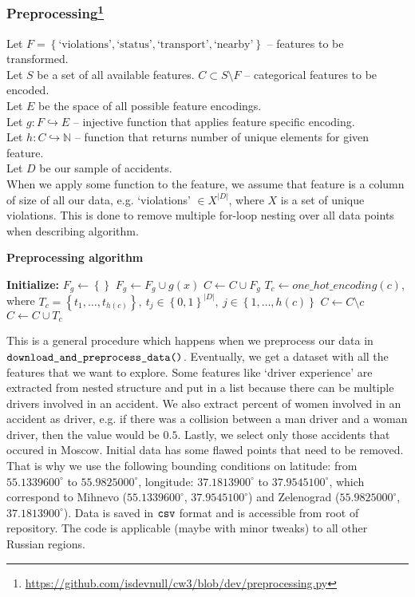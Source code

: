 \subsubsection[Preprocessing]{Preprocessing\footnote{\href{https://github.com/isdevnull/cw3/blob/dev/preprocessing.py}
{https://github.com/isdevnull/cw3/blob/dev/preprocessing.py}}}
Let $F = \left\{ \text{`violations'}, \text{`status'}, \text{`transport'}, \text{`nearby'} \right\} $ 
	– features to be transformed. \\
Let $S$ be a set of all available features. $C \subset S \setminus F$ – categorical features to be encoded. \\
Let $E$ be the space of all possible feature encodings. \\
Let $g \colon F \hookrightarrow E$ – injective function that applies feature specific encoding. \\
Let $h \colon C \hookrightarrow \mathbb{N} $ – function that returns number of unique elements for given feature. \\
Let $D$ be our sample of accidents. \\
When we apply some function to the feature, we assume that feature is a column of size of all our data, e.g.
`violations' $\in X^{|D|}$, where $X$ is a set of unique violations.
This is done to remove multiple for-loop nesting over all data points when describing algorithm.
\begin{algorithm}[H]
	\caption*{\textbf{Preprocessing algorithm}}
\begin{algorithmic}[1]
	\State \textbf{Initialize:} $F_g \gets \left\{  \right\} $ 
	\State $F_g \gets F_g \cup g(x)$
	\EndFor
	\State $C \gets C \cup F_g$ 
	\State $T_c \gets one\_hot\_encoding(c)$, where $T_c = \left\{ t_1, \ldots, t_{h(c)} \right\},
	 \ t_j \in \left\{ 0, 1 \right\}^{|D|},\ j \in \left\{ 1, \ldots, h(c) \right\} $
	\State $C \gets C \setminus c$
	\State $C \gets C \cup T_c$
	\EndFor
\end{algorithmic}	
\end{algorithm}
\noindent
This is a general procedure which happens when we preprocess our data in $\verb|download_and_preprocess_data()|$.
Eventually, we get a dataset with all the features that we want to explore.
Some features like `driver experience' are extracted from nested structure and put in a list
because there can be multiple drivers involved in an accident.
We also extract percent of women involved in an accident as driver, e.g. if there was a collision between a man driver and a woman driver,
then the value would be $0.5$.
Lastly, we select only those accidents that occured in Moscow. Initial data has some flawed points that need to be removed.
That is why we use the following bounding conditions on latitude: from $55.1339600^\circ$ to $55.9825000^\circ$,
longitude: $37.1813900^\circ$ to $37.9545100^\circ$, which
correspond to Mihnevo ($55.1339600^\circ$, $37.9545100^\circ$) and Zelenograd ($55.9825000^\circ$, $37.1813900^\circ$).
Data is saved in $\verb|csv|$ format and is accessible from root of repository. The code is applicable (maybe with minor tweaks)
to all other Russian regions.
